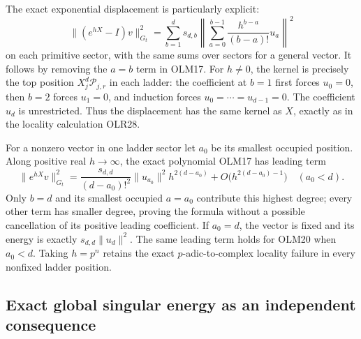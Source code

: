The exact exponential displacement is particularly explicit:
\[
\boxed{
\|(e^{hX}-I)v\|_{G_t}^2
=\sum_{b=1}^d s_{d,b}
 \left\|\sum_{a=0}^{b-1}\frac{h^{b-a}}{(b-a)!}u_a\right\|^2}
\tag{OLM20}
\]
on each primitive sector, with the same sums over sectors for
a general vector. It follows by removing the $a=b$ term in
OLM17. For $h\ne0$, the kernel is precisely the top position
$X_j^d\mathcal P_{j,r}$ in each ladder: the coefficient at
$b=1$ first forces $u_0=0$, then $b=2$ forces $u_1=0$, and
induction forces $u_0=\cdots=u_{d-1}=0$. The coefficient $u_d$
is unrestricted. Thus the displacement has the same kernel
as $X$, exactly as in the locality calculation OLR28.

For a nonzero vector in one ladder sector let $a_0$ be its
smallest occupied position. Along positive real $h\to\infty$,
the exact polynomial OLM17 has leading term
\[
\|e^{hX}v\|_{G_t}^2
=\frac{s_{d,d}}{(d-a_0)!^2}\|u_{a_0}\|^2h^{2(d-a_0)}
+O\bigl(h^{2(d-a_0)-1}\bigr)
\quad(a_0<d).
\tag{OLM21}
\]
Only $b=d$ and its smallest occupied $a=a_0$ contribute this
highest degree; every other term has smaller degree, proving
the formula without a possible cancellation of its positive
leading coefficient. If $a_0=d$, the vector is fixed and its
energy is exactly $s_{d,d}\|u_d\|^2$.
The same leading term holds for OLM20 when $a_0<d$.
Taking $h=p^n$ retains the exact $p$-adic-to-complex locality
failure in every nonfixed ladder position.

\subsection{Exact global singular energy as an independent consequence}

